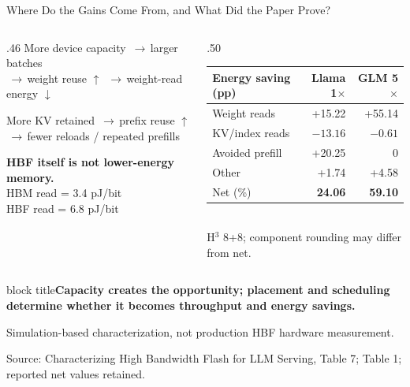 \documentclass[aspectratio=169,10pt]{beamer}
\newcommand{\takeaway}[1]{\par\vspace{.12cm}\begin{beamercolorbox}[rounded=true,sep=.12cm,wd=\linewidth]{block title}\small\bfseries #1\end{beamercolorbox}}
\newcommand{\arr}{\,$\rightarrow$\,}
\begin{document}
\begin{frame}[t]{Where Do the Gains Come From, and What Did the Paper Prove?}

\begin{columns}[T,onlytextwidth]
\begin{column}{.46\textwidth}\small
More device capacity \arr larger batches\\
\arr weight reuse $\uparrow$ \arr weight-read energy $\downarrow$
\par\vspace{.2cm}
More KV retained \arr prefix reuse $\uparrow$\\
\arr fewer reloads / repeated prefills
\par\vspace{.22cm}
\textbf{HBF itself is not lower-energy memory.}\\[.08cm]
HBM read = 3.4 pJ/bit\\
HBF read = 6.8 pJ/bit
\end{column}
\begin{column}{.50\textwidth}\small
\begin{tabular}{@{}lrr@{}}\toprule
Energy saving (pp)& Llama 1$\times$& GLM 5$\times$\\\midrule
Weight reads&+15.22&+55.14\\
KV/index reads&$-13.16$&$-0.61$\\
Avoided prefill&+20.25&0\\
Other&+1.74&+4.58\\\midrule
Net (\%)&\textbf{24.06}&\textbf{59.10}\\\bottomrule
\end{tabular}\\[.08cm]
\scriptsize H$^3$ 8+8; component rounding may differ from net.
\end{column}
\end{columns}
\vfill
\takeaway{Capacity creates the opportunity; placement and scheduling determine whether it becomes throughput and energy savings.}
\par\vspace{.1cm}
{\small Simulation-based characterization, not production HBF hardware measurement.}
\par\vspace{.14cm}
{\fontsize{7}{8}\selectfont\color{Muted}Source: Characterizing High Bandwidth Flash for LLM Serving, Table 7; Table 1; reported net values retained.\par}
\end{frame}
\end{document}
